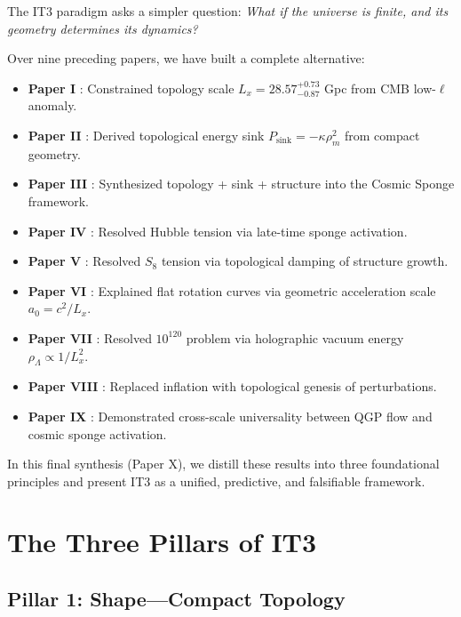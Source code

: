 \documentclass[12pt,a4paper]{article}
\begin{document}
The IT3 paradigm asks a simpler question: \textit{What if the universe is finite, and its geometry determines its dynamics?}

Over nine preceding papers, we have built a complete alternative:
\begin{itemize}
    \item \textbf{Paper I} \citep{Logvinovich2026a}: Constrained topology scale $L_x = 28.57^{+0.73}_{-0.87}$ Gpc from CMB low-$\ell$ anomaly.
    \item \textbf{Paper II} \citep{Logvinovich2026b}: Derived topological energy sink $P_{\mathrm{sink}} = -\kappa \rho_m^2$ from compact geometry.
    \item \textbf{Paper III} \citep{Logvinovich2026c}: Synthesized topology + sink + structure into the Cosmic Sponge framework.
    \item \textbf{Paper IV} \citep{Logvinovich2026d}: Resolved Hubble tension via late-time sponge activation.
    \item \textbf{Paper V} \citep{Logvinovich2026e}: Resolved $S_8$ tension via topological damping of structure growth.
    \item \textbf{Paper VI} \citep{Logvinovich2026f}: Explained flat rotation curves via geometric acceleration scale $a_0 = c^2/L_x$.
    \item \textbf{Paper VII} \citep{Logvinovich2026g}: Resolved $10^{120}$ problem via holographic vacuum energy $\rho_\Lambda \propto 1/L_x^2$.
    \item \textbf{Paper VIII} \citep{Logvinovich2026h}: Replaced inflation with topological genesis of perturbations.
    \item \textbf{Paper IX} \citep{Logvinovich2026i}: Demonstrated cross-scale universality between QGP flow and cosmic sponge activation.
\end{itemize}

In this final synthesis (Paper X), we distill these results into three foundational principles and present IT3 as a unified, predictive, and falsifiable framework.

\section{The Three Pillars of IT3}

\subsection{Pillar 1: Shape---Compact Topology}
\end{document}
